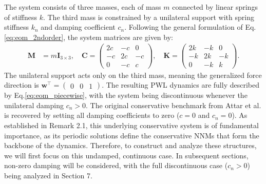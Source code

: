\documentclass[a4paper,9pt,parskip=half,english]{article}
\theoremstyle{plain}
\theoremstyle{definition}
\newcommand{\T}{^{\!\top}} %
\newcommand{\vw}{\mathbf w}
\newcommand{\vC}{\mathbf C}
\newcommand{\vI}{\mathbf I}
\newcommand{\vK}{\mathbf K}
\newcommand{\vM}{\mathbf M}
\begin{document}
The system consists of three masses, each of mass $m$ connected by linear springs of stiffness $k$. The third mass is constrained by a unilateral support with spring stiffness $k_n$ and damping coefficient $c_n$. Following the general formulation of Eq.\eqref{eq:eom_2ndorder}, the system matrices are given by:
\begin{align}
	\vM &= m \vI_{3\times 3}, \quad
	\vC = \begin{pmatrix}
		2c & -c & 0 \\ -c & 2c & -c \\ 0 & -c & c
	\end{pmatrix}, \quad
	\vK = \begin{pmatrix}
		2k & -k & 0 \\ -k & 2k & -k \\ 0 & -k & k
	\end{pmatrix}.
\end{align}
The unilateral support acts only on the third mass, meaning the generalized force direction is ${\vw\T = \begin{pmatrix}
	0 & 0 & 1
\end{pmatrix}}$. The resulting PWL dynamics are fully described by Eq.\eqref{eq:eom_piecewise}, with the system being discontinuous whenever the unilateral damping $c_n>0$.
The original conservative benchmark from Attar et al. \cite{Attar2017} is recovered by setting all damping coefficients to zero ($c=0$ and $c_n=0$). As established in Remark 2.1, this underlying conservative system is of fundamental importance, as its periodic solutions define the conservative NNMs that form the backbone of the dynamics. Therefore, to construct and analyze these structures, we will first focus on this undamped, continuous case. In subsequent sections, non-zero damping will be considered, with the full discontinuous case ($c_n>0$) being analyzed in Section 7.
\end{document}
